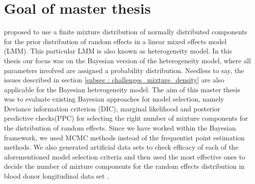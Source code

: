 \section{Goal of master thesis}
\label{sec : goal}
\citet*{verbeke_linear_1996} proposed to use a finite mixture distribution of normally distributed components for the prior distribution of random effects in a linear mixed effects model (LMM). This particular LMM is also known as heterogeneity model. In this thesis our focus was on the Bayesian version of the heterogeneity model, where all parameters involved are assigned a probability distribution. Needless to say, the issues described in section \ref{subsec : challenges_mixture_density} are also applicable for the Bayesian heterogeneity model. The aim of this master thesis was to evaluate existing Bayesian approaches for model selection, namely Deviance information criterion (DIC), marginal likelihood and posterior predictive checks(PPC) for selecting the right number of mixture components for the distribution of random effects. Since we have worked within the Bayesian framework, we used MCMC methods instead of the frequentist point estimation methods. We also generated artificial data sets to check efficacy of each of the aforementioned model selection criteria and then used the most effective ones to decide the number of mixture components for the random effects distribution in blood donor longitudinal data set \citep{nasserinejad_prevalence_2015}.